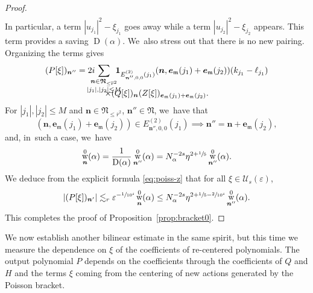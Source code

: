 \documentclass[10pt,a4paper]{amsart}
\DeclareMathOperator{\rw}{w}
\theoremstyle{plain}
\theoremstyle{definition}
\newcommand{\nb}{{\boldsymbol n}}
\newcommand{\Nb}{{\boldsymbol{\mathfrak{N}}}}
\newcommand{\1}{\mathbf{1}}
\let\epsilon\varepsilon
\begin{document}
\begin{proof}
\begin{multline*}
\end{multline*}
In particular, a term $|u_{j_{1}}|^{2}-\xi_{j_{1}}$ goes away while a term $|u_{j_{2}}|^{2}-\xi_{j_{2}}$ appears. This term provides a saving $\operatorname{D}(\alpha)$. We~also stress out that there is no new pairing.
Organizing the terms gives
\begin{multline}
\label{eq:poiss-z}
(P[\xi])_{\nb''}
= 2i\hspace*{-4mm}\sum_{\substack{\nb\in\Nb_{\leq\overline{r}^{2}} \\ |j_{1}|,|j_{2}|\leq M}}\hspace*{-3mm}
\mathbf{1}
_{E_{\nb'',0,0}^{(2)}(j_{1})}
(
\nb,
\boldsymbol{e}_{\mathfrak{m}}(j_{1})+\boldsymbol{e}_{\mathfrak{m}}(j_{2})
)
(k_{j_{1}}-\ell_{j_{1}})\\[
-10pt]
\times(Q[\xi])_{\nb}
(Z[\xi])_{\boldsymbol{e}_{\mathfrak{m}}(j_{1})+\boldsymbol{e}_{\mathfrak{m}}(j_{2})}.
\end{multline}
For $|j_{1}|,|j_{2}|\leq M$ and $\nb\in\Nb_{\leq\overline{r}^{2}}$, $\nb''\in\Nb$, we~have that
\begin{equation}
\label{eq:rel}
(
\nb,
\boldsymbol{e}_{\mathfrak{m}}(j_{1})+\boldsymbol{e}_{\mathfrak{m}}(j_{2})
)
\in
E_{\nb'',0,0}^{(2)}(j_{1})
\implies \nb''=\nb+\boldsymbol{e}_{\mathfrak{m}}(j_{2}),
\end{equation}
and, in~such a case, we~have
\[
\rw_{\nb}^{0}(\alpha) = \frac{1}{\operatorname{D}(\alpha)}\rw_{\nb''}^{0}(\alpha) = N_{\alpha}^{-2s}\eta^{2+\sfrac{1}{5}}\rw_{\nb''}^{0}(\alpha).
\]
We deduce from the explicit formula \eqref{eq:poiss-z} that for all $\xi\in\mathcal{U}_{s}(\epsilon)$,
\begin{equation}
\label{eq:pr-z}
|(P[\xi])_{\nb'}|
\lesssim_{r}\epsilon^{-\sfrac{1}{10^{4}}}
\rw_{\nb}^{0}(\alpha)
\leq
N_{\alpha}^{-2s}\eta^{2+\sfrac{1}{5}-\sfrac{2}{10^{4}}}\rw_{\nb''}^{0}(\alpha).
\end{equation}
This completes the proof of Proposition~\ref{prop:bracket0}.
\end{proof}

We now establish another bilinear estimate in the same spirit, but this time we measure the dependence on $\xi$ of the coefficients of re-centered polynomials. The output polynomial $P$ depends on the coefficients through the coefficients of $Q$ and $H$ and the terms $\xi$ coming from the centering of new actions generated by the Poisson bracket.
\end{document}
